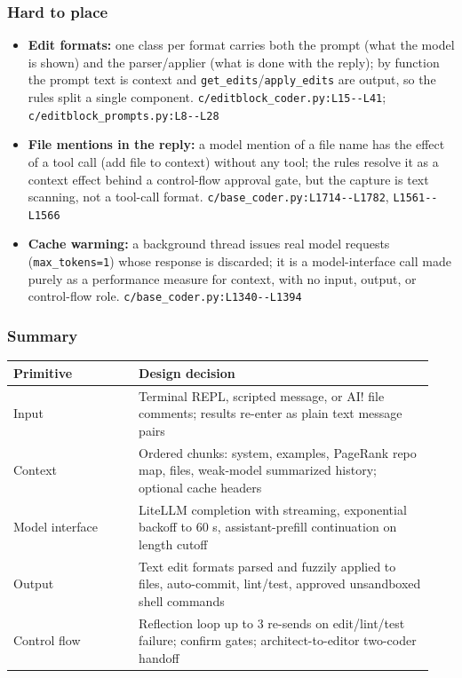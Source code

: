 \subsubsection*{Hard to place}
\begin{itemize}
\item \textbf{Edit formats:} one class per format carries both the prompt (what the model is shown) and the parser/applier (what is done with the reply); by function the prompt text is context and \texttt{get\_\allowbreak{}edits}/\texttt{apply\_\allowbreak{}edits} are output, so the rules split a single component. \texttt{c/\allowbreak{}editblock\_\allowbreak{}coder.\allowbreak{}py:\allowbreak{}L15-\allowbreak{}-\allowbreak{}L41}; \texttt{c/\allowbreak{}editblock\_\allowbreak{}prompts.\allowbreak{}py:\allowbreak{}L8-\allowbreak{}-\allowbreak{}L28}
\item \textbf{File mentions in the reply:} a model mention of a file name has the effect of a tool call (add file to context) without any tool; the rules resolve it as a context effect behind a control-flow approval gate, but the capture is text scanning, not a tool-call format. \texttt{c/\allowbreak{}base\_\allowbreak{}coder.\allowbreak{}py:\allowbreak{}L1714-\allowbreak{}-\allowbreak{}L1782}, \texttt{L1561-\allowbreak{}-\allowbreak{}L1566}
\item \textbf{Cache warming:} a background thread issues real model requests (\texttt{max\_\allowbreak{}tokens=1}) whose response is discarded; it is a model-interface call made purely as a performance measure for context, with no input, output, or control-flow role. \texttt{c/\allowbreak{}base\_\allowbreak{}coder.\allowbreak{}py:\allowbreak{}L1340-\allowbreak{}-\allowbreak{}L1394}
\end{itemize}

\subsubsection*{Summary}
\begin{longtable}{@{}p{0.28\linewidth}p{0.66\linewidth}@{}}
\toprule \textbf{Primitive} & \textbf{Design decision} \\ \midrule \endhead
Input & Terminal REPL, scripted message, or AI! file comments; results re-enter as plain text message pairs \\
Context & Ordered chunks: system, examples, PageRank repo map, files, weak-model summarized history; optional cache headers \\
Model interface & LiteLLM completion with streaming, exponential backoff to 60 s, assistant-prefill continuation on length cutoff \\
Output & Text edit formats parsed and fuzzily applied to files, auto-commit, lint/test, approved unsandboxed shell commands \\
Control flow & Reflection loop up to 3 re-sends on edit/lint/test failure; confirm gates; architect-to-editor two-coder handoff \\
\bottomrule \end{longtable}


